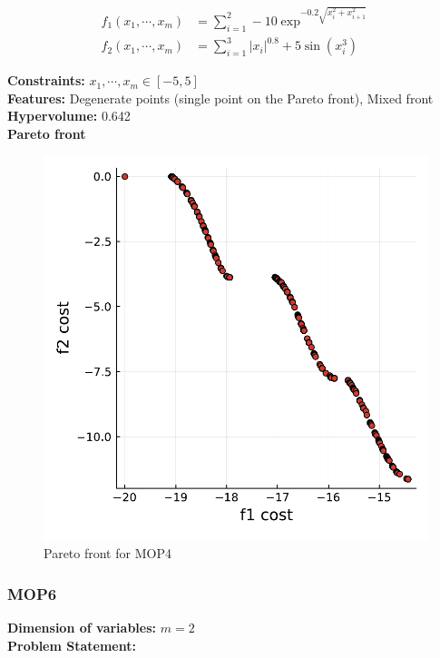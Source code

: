 \documentclass[11pt,oneside,onecolumn,openright]{article}
\begin{document}
  \begin{equation}
  \begin{aligned}
  f_{1}\left(x_{1}, \cdots, x_{m}\right) &=\sum_{i=1}^{2}-10 \exp ^{-0.2 \sqrt{x_{i}^{2}+x_{i+1}^{2}}} \\
  f_{2}\left(x_{1}, \cdots, x_{m}\right) &=\sum_{i=1}^{3}\left|x_{i}\right|^{0.8}+5 \sin \left(x_{i}^{3}\right)
  \end{aligned}
  \end{equation}

  \noindent\textbf{Constraints: } $x_{1},\cdots , x_{m} \in[-5,5]$\\
  \noindent\textbf{Features: } Degenerate points (single point on the Pareto front), Mixed front\\
  \noindent\textbf{Hypervolume: } 0.642\\
  \noindent\textbf{Pareto front}
      \begin{figure}[H]
      \centering
      \includegraphics[width=12cm]{fig/mop4.pdf}
      \cprotect\caption{Pareto front for MOP4}
      \end{figure}

   \subsubsection{MOP6~\cite{huband2006review}}
   \textbf{Dimension of variables: }$m=2$\\
  \noindent\textbf{Problem Statement: }
\end{document}
